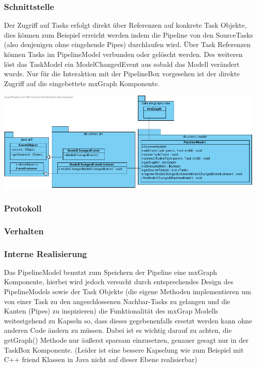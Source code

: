 \documentclass[a4paper,12pt]{scrartcl}
\begin{document}
\subsubsection{Schnittstelle}
Der Zugriff auf Tasks erfolgt direkt über Referenzen auf konkrete Task Objekte, dies können zum Beispiel erreicht werden
indem die Pipeline von den SourceTasks (also denjenigen ohne eingehende Pipes) durchlaufen wird. Über Task Referenzen können Tasks im PipelineModel verbunden oder gelöscht werden. Des weiteren löst das TaskModel ein ModelChangedEvent aus sobald das Modell verändert wurde. Nur für die Interaktion mit der PipelineBox vorgesehen ist der direkte Zugriff auf die eingebettete mxGraph Komponente.
\begin{center}
\includegraphics[width=17cm]{Schnittstelle_PipelineModel.png}
\end{center}
\subsubsection{Protokoll}
\subsubsection{Verhalten}
\subsubsection{Interne Realisierung}
Das PipelineModel benutzt zum Speichern der Pipeline eine mxGraph Komponente, hierbei wird jedoch versucht durch entsprechendes Design des PipelineModels sowie der Task Objekte (die eigene Methoden implementieren um von einer Task zu
den angeschlossenen Nachbar-Tasks zu gelangen und die Kanten (Pipes) zu inspizieren) die Funktionalität des mxGrap Modells
weitestgehend zu Kapseln so, dass dieses gegebenenfalls ersetzt werden kann ohne anderen Code ändern zu müssen.
Dabei ist es wichtig darauf zu achten, die getGraph() Methode nur äußerst sparsam einzusetzen, genauer gesagt nur in der TaskBox Komponente. (Leider ist eine bessere Kapselung wie zum Beispiel mit C++ friend Klassen in Java nicht auf dieser Ebene realisierbar)
\end{document}
